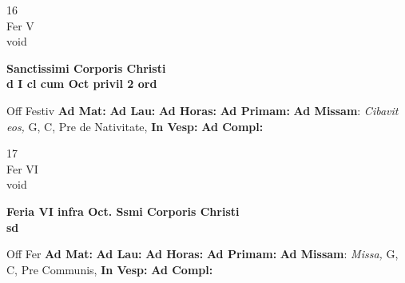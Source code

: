 \documentclass[10pt, openany]{book}
\begin{document}
    \begin{center}
        \begin{minipage}{3.5in}
            \vspace{2em}
            \begin{minipage}{0.5in}
                {\Huge 16} \\
                {\normalsize Fer V} \\
                {\normalsize void}
            \end{minipage}
            \begin{minipage}{3.0in}
                \textbf{ \large Sanctissimi Corporis Christi \\
                \textnormal{\normalsize d I cl cum Oct privil 2 ord}} \\ 
            \end{minipage}
            \begin{justify}Off Festiv
                \textbf{Ad Mat: }
                \textbf{Ad Lau: }
                \textbf{Ad Horas: }
                \textbf{Ad Primam: }\textbf{Ad Missam}: \textit{Cibavit eos,} G, C, Pre de Nativitate,  
                \textbf{In Vesp: }
                \textbf{Ad Compl: }
            \end{justify}
        \end{minipage}
    \end{center}

    \begin{center}
        \begin{minipage}{3.5in}
            \vspace{2em}
            \begin{minipage}{0.5in}
                {\Huge 17} \\
                {\normalsize Fer VI} \\
                {\normalsize void}
            \end{minipage}
            \begin{minipage}{3.0in}
                \textbf{ \large Feria VI infra Oct. Ssmi Corporis Christi \\
                \textnormal{\normalsize sd}} \\ 
            \end{minipage}
            \begin{justify}Off Fer
                \textbf{Ad Mat: }
                \textbf{Ad Lau: }
                \textbf{Ad Horas: }
                \textbf{Ad Primam: }\textbf{Ad Missam}: \textit{Missa,} G, C, Pre Communis,  
                \textbf{In Vesp: }
                \textbf{Ad Compl: }
            \end{justify}
        \end{minipage}
    \end{center}
\end{document}
